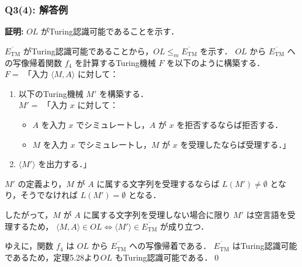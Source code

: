 \begin{frame}
\frametitle{Q3(4): 解答例}

\textbf{証明:} $OL$ がTuring認識可能であることを示す．

$\overline{E_{\mathrm{TM}}}$ がTuring認識可能であることから，$OL \le_m \overline{E_{\mathrm{TM}}}$ を示す．
$OL$ から $\overline{E_{\mathrm{TM}}}$ への写像帰着関数 $f_{4}$ を計算するTuring機械 $F$ を以下のように構築する．\\
$F=$ 「入力 $\langle M, A \rangle$ に対して：
\begin{enumerate}
    \item 以下のTuring機械 $M'$ を構築する． \\
     $M'=$ 「入力 $x$ に対して：
     \begin{itemize}
         \item $A$ を入力 $x$ でシミュレートし，$A$ が $x$ を拒否するならば拒否する．
         \item $M$ を入力 $x$ でシミュレートし，$M$ が $x$ を受理したならば受理する．」
     \end{itemize}
    \item $\langle M' \rangle$ を出力する．」
\end{enumerate}

\framebreak %

$M'$ の定義より，$M$ が $A$ に属する文字列を受理するならば $L(M') \neq \emptyset$ となり，そうでなければ $L(M') = \emptyset$ となる．

したがって，$M$ が $A$ に属する文字列を受理しない場合に限り $M'$ は空言語を受理するため，
$\langle M, A \rangle \in OL \iff \langle M' \rangle \in \overline{E_{\mathrm{TM}}}$ が成り立つ．

ゆえに，関数 $f_{4}$ は $OL$ から $\overline{E_{\mathrm{TM}}}$ への写像帰着である．
$\overline{E_{\mathrm{TM}}}$ はTuring認識可能であるため，定理5.28より$OL$ もTuring認識可能である．\qed
\end{frame}